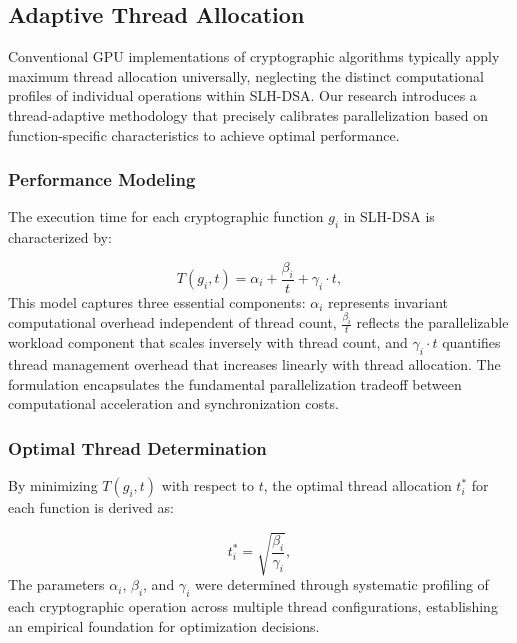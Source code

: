 \documentclass[journal]{IEEEtran}
\begin{document}
\subsection{Adaptive Thread Allocation}

Conventional GPU implementations of cryptographic algorithms typically apply maximum thread allocation universally, neglecting the distinct computational profiles of individual operations within SLH-DSA. Our research introduces a thread-adaptive methodology that precisely calibrates parallelization based on function-specific characteristics to achieve optimal performance.

\subsubsection{Performance Modeling}

The execution time for each cryptographic function $g_i$ in SLH-DSA is characterized by:

\begin{equation}
  \label{eq:execution_time_model}
  T(g_i, t) = \alpha_i + \frac{\beta_i}{t} + \gamma_i \cdot t,
\end{equation}
This model captures three essential components: $\alpha_i$ represents invariant computational overhead independent of thread count, $\frac{\beta_i}{t}$ reflects the parallelizable workload component that scales inversely with thread count, and $\gamma_i \cdot t$ quantifies thread management overhead that increases linearly with thread allocation. The formulation encapsulates the fundamental parallelization tradeoff between computational acceleration and synchronization costs.

\subsubsection{Optimal Thread Determination}

By minimizing $T(g_i, t)$ with respect to $t$, the optimal thread allocation $t_i^*$ for each function is derived as:

\begin{equation}
  \label{eq:optimal_thread_count}
  t_i^* = \sqrt{\frac{\beta_i}{\gamma_i}},
\end{equation}
The parameters $\alpha_i$, $\beta_i$, and $\gamma_i$ were determined through systematic profiling of each cryptographic operation across multiple thread configurations, establishing an empirical foundation for optimization decisions.
\end{document}
